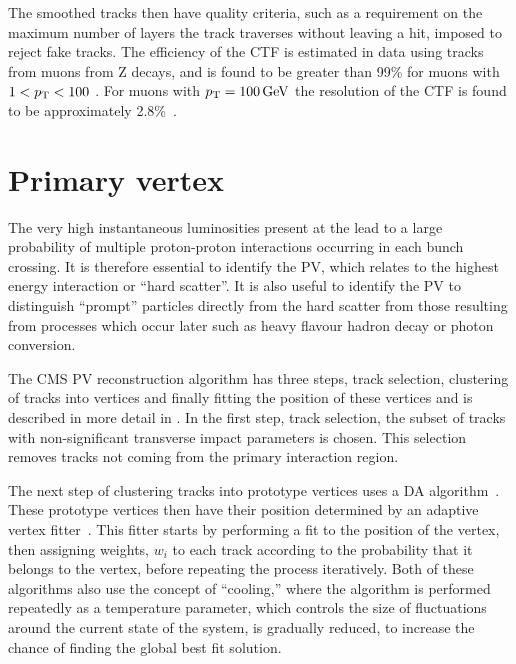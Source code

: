 The smoothed tracks then have quality criteria, such as a requirement on the maximum number of layers the track traverses without leaving a hit, imposed to reject fake tracks. The efficiency of the \ac{CTF} is estimated in data using tracks from muons from Z decays, and is found to be greater than 99\% for muons with $1<p_{\mathrm{T}}<100$ \GeV. For muons with $p_{\mathrm{T}}=100 \,\text{Ge\hspace{-.08em}V}$ the \pt resolution of the \ac{CTF} is found to be approximately 2.8\%~\cite{1748-0221-9-10-P10009}.

\section{Primary vertex}
\label{sec:PV}
The very high instantaneous luminosities present at the \LHC lead to a large probability of multiple proton-proton interactions occurring in each bunch crossing. It is therefore essential to identify the \ac{PV}, which relates to the highest energy interaction or ``hard scatter''. It is also useful to identify the \ac{PV} to distinguish ``prompt'' particles directly from the hard scatter from those resulting from processes which occur later such as heavy flavour hadron decay or photon conversion.

The CMS \ac{PV} reconstruction algorithm has three steps, track selection, clustering of tracks into vertices and finally fitting the position of these vertices and is described in more detail in . In the first step, track selection, the subset of tracks with non-significant transverse impact parameters is chosen. This selection removes tracks not coming from the primary interaction region.

The next step of clustering tracks into prototype vertices uses a \ac{DA} algorithm~\cite{DetAnnealing}. These prototype vertices then have their position determined by an adaptive vertex fitter~\cite{adaptivevertex}. This fitter starts by performing a fit to the position of the vertex, then assigning weights, $w_{i}$ to each track according to the probability that it belongs to the vertex, before repeating the process iteratively. Both of these algorithms also use the concept of ``cooling,'' where the algorithm is performed repeatedly as a temperature parameter, which controls the size of fluctuations around the current state of the system, is gradually reduced, to increase the chance of finding the global best fit solution.

